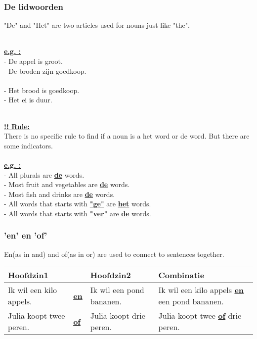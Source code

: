 \documentclass[a4paper,14pt]{extarticle}
\newcommand{\attention}[1]{\underline{\textbf{!! #1}}}
\newcommand{\emp}[1]{\underline{\textbf{#1}}}
\begin{document}
\subsubsection{De lidwoorden}
"De" and "Het" are two articles used for nouns just like "the".
\begin{paracol}{2}
\hfill \\
\emp{e.g. : } \\
- De appel is groot. \\
- De broden zijn goedkoop.
\switchcolumn
\hfill \\ \\
- Het brood is goedkoop. \\
- Het ei is duur.
\end{paracol}
\hfill \\
\attention{Rule:} \\
There is no specific rule to find if a noun is a het word or de word. But there are some indicators. \\ \\
\emp{e.g. : } \\
- All plurals are \emp{de} words. \\
- Most fruit and vegetables are \emp{de} words. \\
- Most fish and drinks are \emp{de} words. \\
- All words that starts with \emp{"ge"} are \emp{het} words. \\
- All words that starts with \emp{"ver"} are \emp{de} words. 
\subsubsection{'en' en 'of'}
En(as in and) and of(as in or) are used to connect to sentences together.\\
\begin{tabularx}{\textwidth}{ p{} p{} p{} p{} }
 \hline
 Hoofdzin1 &  & Hoofdzin2 & Combinatie\\
 \hline
 Ik wil een kilo appels. & \emp{en} & Ik wil een pond bananen. & Ik wil een kilo appels \emp{en} een pond bananen. \\
 Julia koopt twee peren. & \emp{of} & Julia koopt drie peren. & Julia koopt twee \emp{of} drie peren. \\
\end{tabularx}
\end{document}
